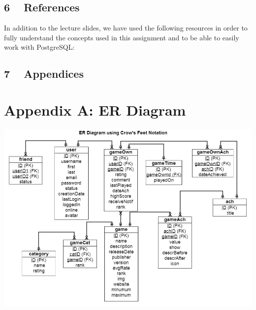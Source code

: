 \documentclass{article}
\begin{document}

\section{6 ~ References}
In addition to the lecture slides, we have used the following resources in order to fully understand the concepts used in this assignment and to be able to easily work with PostgreSQL:
\nocite{link4, link5, link6, db}



\newpage
\section{7 ~ Appendices}
\appendix

\chapter{\textbf{Appendix A: ER Diagram}}
\begin{center}
\includegraphics[width=0.80\columnwidth]{er} %
\end{center}
\end{document}
